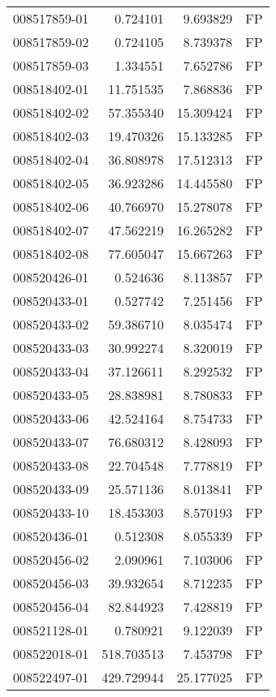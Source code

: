 \begin{tabular}{lrrl}
008517859-01 &    0.724101 &     9.693829 &   FP \\
008517859-02 &    0.724105 &     8.739378 &   FP \\
008517859-03 &    1.334551 &     7.652786 &   FP \\
008518402-01 &   11.751535 &     7.868836 &   FP \\
008518402-02 &   57.355340 &    15.309424 &   FP \\
008518402-03 &   19.470326 &    15.133285 &   FP \\
008518402-04 &   36.808978 &    17.512313 &   FP \\
008518402-05 &   36.923286 &    14.445580 &   FP \\
008518402-06 &   40.766970 &    15.278078 &   FP \\
008518402-07 &   47.562219 &    16.265282 &   FP \\
008518402-08 &   77.605047 &    15.667263 &   FP \\
008520426-01 &    0.524636 &     8.113857 &   FP \\
008520433-01 &    0.527742 &     7.251456 &   FP \\
008520433-02 &   59.386710 &     8.035474 &   FP \\
008520433-03 &   30.992274 &     8.320019 &   FP \\
008520433-04 &   37.126611 &     8.292532 &   FP \\
008520433-05 &   28.838981 &     8.780833 &   FP \\
008520433-06 &   42.524164 &     8.754733 &   FP \\
008520433-07 &   76.680312 &     8.428093 &   FP \\
008520433-08 &   22.704548 &     7.778819 &   FP \\
008520433-09 &   25.571136 &     8.013841 &   FP \\
008520433-10 &   18.453303 &     8.570193 &   FP \\
008520436-01 &    0.512308 &     8.055339 &   FP \\
008520456-02 &    2.090961 &     7.103006 &   FP \\
008520456-03 &   39.932654 &     8.712235 &   FP \\
008520456-04 &   82.844923 &     7.428819 &   FP \\
008521128-01 &    0.780921 &     9.122039 &   FP \\
008522018-01 &  518.703513 &     7.453798 &   FP \\
008522497-01 &  429.729944 &    25.177025 &   FP \\

\end{tabular}
